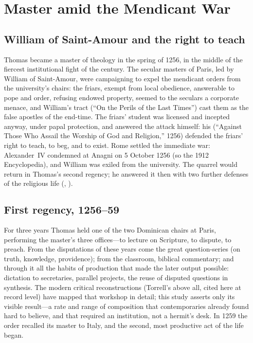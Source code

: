 \section{Master amid the Mendicant War}

\subsection{William of Saint-Amour and the right to teach}

Thomas became a master of theology in the spring of 1256, in the middle of
the fiercest institutional fight of the century. The secular masters of
Paris, led by William of Saint-Amour, were campaigning to expel the
mendicant orders from the university's chairs: the friars, exempt from
local obedience, answerable to pope and order, refusing endowed property,
seemed to the seculars a corporate menace, and William's tract  (``On the Perils of the Last Times'')
cast them as the false apostles of the end-time. The friars' student was
licensed and incepted anyway, under papal protection, and answered the
attack himself: his 
(``Against Those Who Assail the Worship of God and Religion,'' 1256)
defended the friars' right to teach, to beg, and to exist. Rome settled
the immediate war: Alexander~IV condemned  at Anagni
on 5 October 1256 (so the 1912 Encyclopedia), and William was exiled from
the university. The quarrel would return in Thomas's second regency; he
answered it then with two further defenses of the religious life
(, ).

\subsection{First regency, 1256--59}

For three years Thomas held one of the two Dominican chairs at Paris,
performing the master's three offices---to lecture on Scripture, to
dispute, to preach. From the disputations of these years come the great
question-series  (on truth, knowledge, providence);
from the classroom, biblical commentary; and through it all the habits of
production that made the later output possible: dictation to secretaries,
parallel projects, the reuse of disputed questions in synthesis. The
modern critical reconstructions (Torrell's above all, cited here at
record level) have mapped that workshop in detail; this study asserts
only its visible result---a rate and range of composition that
contemporaries already found hard to believe, and that required an
institution, not a hermit's desk. In 1259 the order recalled its master
to Italy, and the second, most productive act of the life began.
